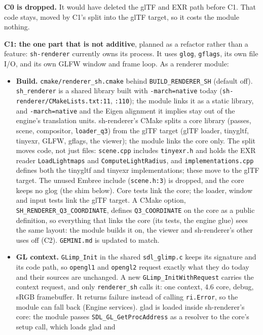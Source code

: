 \documentclass[11pt,a4paper]{article}
\begin{document}
\textbf{C0 is dropped.} It would have deleted the glTF and EXR path before C1. That code stays,
moved by C1's split into the glTF target, so it costs the module nothing.

\textbf{C1: the one part that is not additive}, planned as a refactor rather than a feature:
\texttt{sh-renderer} currently owns its process. It uses \texttt{glog}, \texttt{gflags}, its own
file I/O, and its own GLFW window and frame loop. As a renderer module:
\begin{itemize}
\item \textbf{Build.} \texttt{cmake/renderer\_sh.cmake} behind \texttt{BUILD\_RENDERER\_SH}
  (default off). \texttt{sh\_renderer} is a shared library built with \texttt{-march=native} today
  (\texttt{sh-renderer/CMakeLists.txt:11}, \texttt{:110}); the module links it as a static
  library, and \texttt{-march=native} and the Eigen alignment it implies stay out of the
  engine's translation units. sh-renderer's CMake splits a core library (passes, scene,
  compositor, \texttt{loader\_q3}) from the glTF target (glTF loader, tinygltf, tinyexr, GLFW,
  gflags, the viewer); the module links the core only. The split moves code, not just files:
  \texttt{scene.cpp} includes \texttt{tinyexr.h} and holds the EXR reader \texttt{LoadLightmaps}
  and \texttt{ComputeLightRadius}, and \texttt{implementations.cpp} defines both the tinygltf and
  tinyexr implementations; these move to the glTF target. The unused Embree include
  (\texttt{scene.h:3}) is dropped, and the core keeps no glog (the shim below). Core tests link the
  core; the loader, window and input tests link the glTF target. A CMake option,
  \texttt{SH\_RENDERER\_Q3\_COORDINATE}, defines \texttt{Q3\_COORDINATE} on the core as a public definition, so everything that
  links the core (its tests, the engine glue) sees the same layout: the module
  builds it on, the viewer and sh-renderer's other uses off (C2). \texttt{GEMINI.md} is updated
  to match.
\item \textbf{GL context.} \texttt{GLimp\_Init} in the shared \texttt{sdl\_glimp.c} keeps its
  signature and its code path, so \texttt{opengl1} and \texttt{opengl2} request exactly what they
  do today and their sources are unchanged. A new \texttt{GLimp\_InitWithRequest} carries the
  context request, and only \texttt{renderer\_sh} calls it: one context, 4.6 core, debug, sRGB
  framebuffer. It returns failure instead of calling \texttt{ri.Error}, so the module can fall
  back (Engine services). glad is loaded inside sh-renderer's core: the module passes
  \texttt{SDL\_GL\_GetProcAddress} as a resolver to the core's setup call, which loads glad and

\end{itemize}
\end{document}
